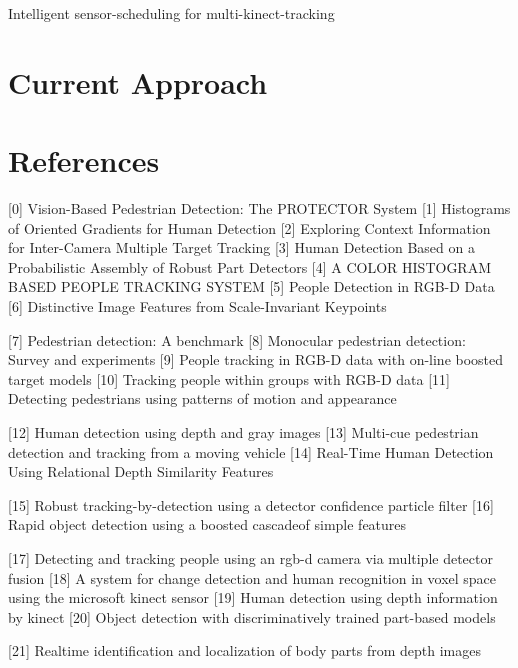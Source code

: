 \documentclass[paper=a4, fontsize=11pt]{scrartcl}
\numberwithin{equation}{section}		%
\numberwithin{figure}{section}			%
\numberwithin{table}{section}				%
\begin{document}
Intelligent sensor-scheduling for multi-kinect-tracking

\section{Current Approach}

\section{References}

[0] Vision-Based Pedestrian Detection: The PROTECTOR System
[1] Histograms of Oriented Gradients for Human Detection
[2] Exploring Context Information for Inter-Camera Multiple Target Tracking
[3] Human Detection Based on a Probabilistic Assembly of Robust Part Detectors
[4] A COLOR HISTOGRAM BASED PEOPLE TRACKING SYSTEM
[5] People Detection in RGB-D Data
[6] Distinctive Image Features from Scale-Invariant Keypoints


[7] Pedestrian detection: A benchmark
[8] Monocular pedestrian detection: Survey and experiments
[9] People tracking in RGB-D data with on-line boosted target models
[10] Tracking people within groups with RGB-D data
[11] Detecting pedestrians using patterns of motion and appearance

[12] Human detection using depth and gray images
[13] Multi-cue pedestrian detection and tracking from a moving vehicle
[14] Real-Time Human Detection Using Relational Depth Similarity Features

[15] Robust tracking-by-detection using a detector confidence particle filter
[16] Rapid object detection using a boosted cascadeof simple features

[17] Detecting and tracking people using an rgb-d camera via multiple detector fusion
[18] A system for change detection and human recognition in voxel space using the microsoft kinect sensor
[19] Human detection using depth information by kinect
[20] Object detection with discriminatively trained part-based models

[21] Realtime identification and localization of body parts from depth images
\end{document}
